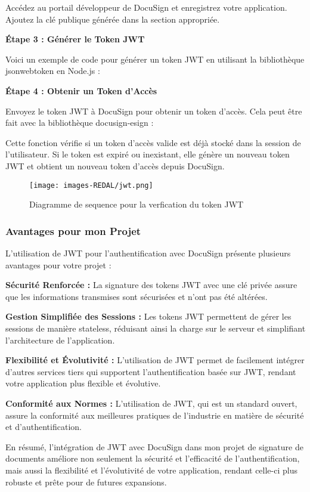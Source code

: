 Accédez au portail développeur de DocuSign et enregistrez votre application. Ajoutez la clé publique générée dans la section appropriée.

\textbf{Étape 3 : Générer le Token JWT}

Voici un exemple de code pour générer un token JWT en utilisant la bibliothèque jsonwebtoken en Node.js :


\textbf{Étape 4 : Obtenir un Token d'Accès}

Envoyez le token JWT à DocuSign pour obtenir un token d'accès. Cela peut être fait avec la bibliothèque docusign-esign :


Cette fonction vérifie si un token d'accès valide est déjà stocké dans la session de l'utilisateur. Si le token est expiré ou inexistant, elle génère un nouveau token JWT et obtient un nouveau token d'accès depuis DocuSign.

\begin{figure}[H]
\begin{center}
\texttt{[image: images-REDAL/jwt.png]}
\end{center}
\caption{Diagramme de sequence pour la verfication du token JWT  }
\end{figure}

\subsubsection{Avantages pour mon Projet}
L'utilisation de JWT pour l'authentification avec DocuSign présente plusieurs avantages pour votre projet :

\textbf{Sécurité Renforcée :}
La signature des tokens JWT avec une clé privée assure que les informations transmises sont sécurisées et n'ont pas été altérées.

\textbf{Gestion Simplifiée des Sessions :}
Les tokens JWT permettent de gérer les sessions de manière stateless, réduisant ainsi la charge sur le serveur et simplifiant l'architecture de l'application.

\textbf{Flexibilité et Évolutivité :}
L'utilisation de JWT permet de facilement intégrer d'autres services tiers qui supportent l'authentification basée sur JWT, rendant votre application plus flexible et évolutive.

\textbf{Conformité aux Normes : }
L'utilisation de JWT, qui est un standard ouvert, assure la conformité aux meilleures pratiques de l'industrie en matière de sécurité et d'authentification.

En résumé, l'intégration de JWT avec DocuSign dans mon projet de signature de documents améliore non seulement la sécurité et l'efficacité de l'authentification, mais aussi la flexibilité et l'évolutivité de votre application, rendant celle-ci plus robuste et prête pour de futures expansions.


